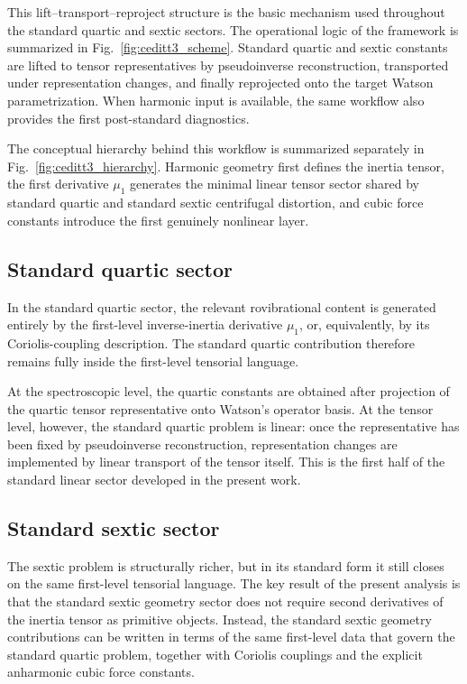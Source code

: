 \documentclass[aip,jcp,reprint,floatfix]{revtex4-2}
\begin{document}
This lift--transport--reproject structure is the basic mechanism used
throughout the standard quartic and sextic sectors. The operational
logic of the framework is summarized in Fig.~\ref{fig:ceditt3_scheme}.
Standard quartic and sextic constants are lifted to tensor
representatives by pseudoinverse reconstruction, transported under
representation changes, and finally reprojected onto the target
Watson parametrization. When harmonic input is available, the same
workflow also provides the first post-standard diagnostics.



The conceptual hierarchy behind this workflow is summarized separately
in Fig.~\ref{fig:ceditt3_hierarchy}. Harmonic geometry first defines
the inertia tensor, the first derivative $\mu_1$ generates the minimal
linear tensor sector shared by standard quartic and standard sextic
centrifugal distortion, and cubic force constants introduce the first
genuinely nonlinear layer.



\subsection{Standard quartic sector}

In the standard quartic sector, the relevant rovibrational content is
generated entirely by the first-level inverse-inertia derivative
$\mu_1$, or, equivalently, by its Coriolis-coupling description. The
standard quartic contribution therefore remains fully inside the
first-level tensorial language.

At the spectroscopic level, the quartic constants are obtained after
projection of the quartic tensor representative onto Watson's operator
basis. At the tensor level, however, the standard quartic problem is
linear: once the representative has been fixed by pseudoinverse
reconstruction, representation changes are implemented by linear
transport of the tensor itself. This is the first half of the
standard linear sector developed in the present work.

\subsection{Standard sextic sector}

The sextic problem is structurally richer, but in its standard form it
still closes on the same first-level tensorial language. The key
result of the present analysis is that the standard sextic geometry
sector does not require second derivatives of the inertia tensor as
primitive objects. Instead, the standard sextic geometry contributions
can be written in terms of the same first-level data that govern the
standard quartic problem, together with Coriolis couplings and the
explicit anharmonic cubic force constants.
\end{document}
